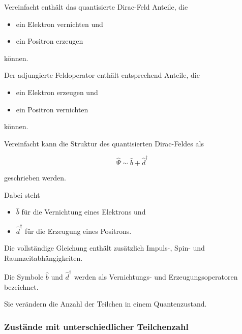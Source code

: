 Vereinfacht enthält das quantisierte Dirac-Feld Anteile, die

\begin{itemize}
	\item ein Elektron vernichten und
	\item ein Positron erzeugen
\end{itemize}

können.

Der adjungierte Feldoperator enthält entsprechend Anteile, die

\begin{itemize}
	\item ein Elektron erzeugen und
	\item ein Positron vernichten
\end{itemize}

können.

\begin{MathBox}
	\label{box:symbolische_struktur_dirac_feld}
	
	Vereinfacht kann die Struktur des quantisierten Dirac-Feldes als
	
	\begin{equation}
		\hat{\Psi}
		\sim
		\hat{b}
		+
		\hat{d}^{\dagger}
	\end{equation}
	
	geschrieben werden.
	
	Dabei steht
	
	\begin{itemize}
		\item \(\hat{b}\) für die Vernichtung eines Elektrons und
		\item \(\hat{d}^{\dagger}\) für die Erzeugung eines Positrons.
	\end{itemize}
	
	Die vollständige Gleichung enthält zusätzlich Impuls-, Spin- und
	Raumzeitabhängigkeiten.
\end{MathBox}

Die Symbole \(\hat{b}\) und \(\hat{d}^{\dagger}\) werden als
Vernichtungs- und Erzeugungsoperatoren%
%
bezeichnet.

Sie verändern die Anzahl der Teilchen in einem Quantenzustand.

\subsubsection*{Zustände mit unterschiedlicher Teilchenzahl}

